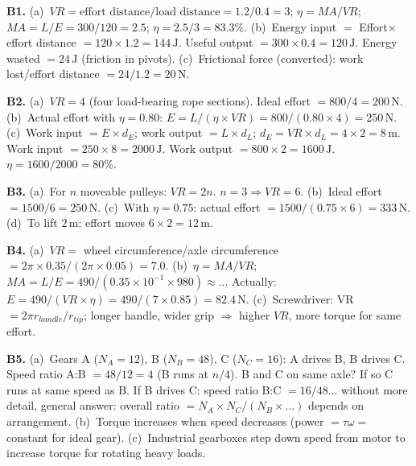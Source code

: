 \textbf{B1.}
(a)~$VR=\text{effort distance}/\text{load distance}
=1.2/0.4=3$; $\eta=MA/VR$; $MA=L/E=300/120=2.5$;
$\eta=2.5/3=83.3\%$. \quad
(b)~Energy input $=$ Effort$\times$effort distance
$=120\times1.2=144\,\text{J}$.
Useful output $=300\times0.4=120\,\text{J}$.
Energy wasted $=24\,\text{J}$ (friction in pivots). \quad
(c)~Frictional force (converted): work lost/effort
distance $=24/1.2=20\,\text{N}$.

\textbf{B2.}
(a)~$VR=4$ (four load-bearing rope sections).
Ideal effort $=800/4=200\,\text{N}$. \quad
(b)~Actual effort with $\eta=0.80$:
$E=L/(\eta\times VR)=800/(0.80\times4)=250\,\text{N}$.
\quad
(c)~Work input $=E\times d_E$; work output
$=L\times d_L$; $d_E=VR\times d_L=4\times2=8\,\text{m}$.
Work input $=250\times8=2000\,\text{J}$.
Work output $=800\times2=1600\,\text{J}$.
$\eta=1600/2000=80\%$. \checkmark

\textbf{B3.}
(a)~For $n$ moveable pulleys: $VR=2n$.
$n=3\Rightarrow VR=6$. \quad
(b)~Ideal effort $=1500/6=250\,\text{N}$. \quad
(c)~With $\eta=0.75$: actual effort
$=1500/(0.75\times6)=333\,\text{N}$. \quad
(d)~To lift $2\,\text{m}$: effort moves $6\times2
=12\,\text{m}$.

\textbf{B4.}
(a)~$VR=$ wheel circumference/axle circumference
$=2\pi\times0.35/(2\pi\times0.05)=7.0$. \quad
(b)~$\eta=MA/VR$; $MA=L/E=490/(0.35\times10^{-1}
\times980)\approx...$
Actually: $E=490/(VR\times\eta)=490/(7\times0.85)
=82.4\,\text{N}$. \quad
(c)~Screwdriver: VR $=2\pi r_{handle}/r_{tip}$;
longer handle, wider grip $\Rightarrow$ higher $VR$,
more torque for same effort.

\textbf{B5.}
(a)~Gears A ($N_A=12$), B ($N_B=48$), C
($N_C=16$): A drives B, B drives C.
Speed ratio A:B $=48/12=4$ (B runs at $n/4$).
B and C on same axle? If so C runs at same speed as B.
If B drives C: speed ratio B:C $=16/48$... without
more detail, general answer: overall ratio
$=N_A\times N_C/(N_B\times...) $ depends on arrangement. \quad
(b)~Torque increases when speed decreases (power $=\tau\omega=$
constant for ideal gear). \quad
(c)~Industrial gearboxes step down speed from motor to
increase torque for rotating heavy loads.

\endgroup


